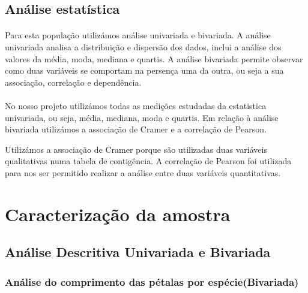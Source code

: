 \documentclass{article}
\begin{document}
\subsection{Análise estatística}

\paragraph{} Para esta população utilizámos análise univariada e bivariada. A análise univariada analisa a distribuição e dispersão dos dados, inclui a análise dos valores da média, moda, mediana e quartis. A  análise bivariada permite observar como duas variáveis se comportam na persença uma da outra, ou seja a sua associação, correlação e dependência.

\paragraph{} No nosso projeto utilizámos todas as medições estudadas da estatistica univariada, ou seja, média, mediana, moda e quartis. Em relação à análise bivariada utilizámos a associação de Cramer e a correlação de Pearson.

Utilizámos a associação de Cramer porque são utilizadas duas variáveis qualitativas numa tabela de contigência. A correlação de Pearson foi utilizada para nos ser permitido realizar a análise entre duas variáveis quantitativas.

\section{Caracterização da amostra}\label{sec:caracterizacao_amostra}

\subsection{Análise Descritiva Univariada e Bivariada}

\subsubsection{Análise do comprimento das pétalas por espécie(Bivariada)}
\end{document}
